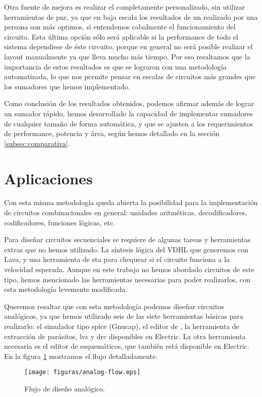 Otra fuente de mejora es realizar el \layout completamente personalizado, sin utilizar herramientas de \gls{pnr}, ya que en baja escala los resultados de un \layout realizado por una persona son más optimos, si entendemos cabalmente el funcionamiento del circuito. Esta última opción sólo será aplicable si la performance de todo el sistema dependiese de éste circuito, porque en general no será posible realizar el layout manualmente ya que lleva mucho más tiempo. Por eso resaltamos que la importancia de estos resultados es que se lograron con una metodología automatizada, lo que nos permite pensar en escalas de circuitos más grandes que los sumadores que hemos implementado.

Como conclusión de los resultados obtenidos, podemos afirmar además de lograr un sumador rápido, hemos desarrollado la capacidad de implementar sumadores de cualquier tamaño de forma automática, y que se ajusten a los requerimientos de performance, potencia y área,  según hemos detallado en la sección \ref{subsec:comparativa}.


\section{Aplicaciones}

Con esta misma metodología queda abierta la posibilidad para la implementación de circuitos combinacionales en general: unidades aritméticas, decodificadores, codificadores, funciones lógicas, etc. 

Para diseñar circuitos secuenciales se requiere de algunas tareas y herramientas extras que no hemos utilizado. La síntesis lógica del VDHL que generemos con Lava, y una herramienta de \gls{sta} para chequear si el circuito funciona a la velocidad esperada. Aunque en este trabajo no hemos abordado circuitos de este tipo, hemos mencionado las herramientas necesarias para poder realizarlos, con esta metodología levemente modificada.

Queremos resaltar que con esta metodología podemos diseñar circuitos analógicos, ya que hemos utilizado seis de las siete herramientas básicas para realizarlo: el simulador tipo \gls{spice} (Gnucap), el editor de \layout, la herramienta de extracción de parásitos, \gls{lvs} y \gls{drc} disponibles en Electric. La otra herramienta necesaria es el editor de esquemáticos, que también está disponible en Electric. En la figura \ref{fig:aflow} mostramos el flujo detalladamente.


\begin{figure}[h]
  \centering
\texttt{[image: figuras/analog-flow.eps]}
  \caption{Flujo de diseño analógico.}
\label{fig:aflow}
\end{figure}
